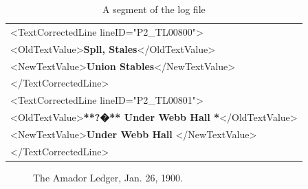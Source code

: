 \documentclass[letterpaper]{article}
\begin{document}
\begin{enumerate}
\begin{table}[h]
\begin{center}
\begin{tabular}{l}
\textless TextCorrectedLine lineID="P2\_TL00800"\textgreater \\
\textless OldTextValue\textgreater \textbf{Spll, Stales}\textless /OldTextValue\textgreater \\
\textless NewTextValue\textgreater \textbf{Union Stables}\textless /NewTextValue\textgreater \\
\textless /TextCorrectedLine\textgreater \\
\textless TextCorrectedLine lineID="P2\_TL00801"\textgreater \\
\textless OldTextValue\textgreater \textbf{**?�** Under Webb Hall *}\textless/OldTextValue\textgreater \\
\textless NewTextValue\textgreater \textbf{Under Webb Hall} \textless/NewTextValue\textgreater \\
\textless /TextCorrectedLine\textgreater \\
\end{tabular}
\end{center}
\caption{A segment of the log file}
\label{table:logfile}
\end{table}

\begin{figure}[th]
\begin{center}
\caption{The Amador Ledger, Jan. 26, 1900.}
\label{News_01}
\end{center}
\end{figure}


\end{enumerate}
\end{document}
